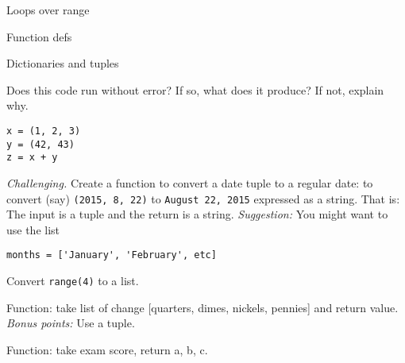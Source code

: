 \documentclass[11pt]{exam}
\begin{document}
\begin{questions}
\item Loops over range


\item Function defs


\item Dictionaries and tuples

\item
Does this code run without error?  If so, what does it produce?  If not, explain why.
\begin{verbatim}
x = (1, 2, 3)
y = (42, 43)
z = x + y
\end{verbatim}



\item {\it Challenging.\/}
Create a function to convert a date tuple to a regular date:
to convert (say) \texttt{(2015, 8, 22)} to \texttt{August 22, 2015} expressed as a string.
That is:  The input is a tuple and the return is a string.
{\it Suggestion:\/} You might want to use the list
\begin{verbatim}
months = ['January', 'February', etc]
\end{verbatim}

\item Convert \texttt{range(4)} to a list.


\item Function:  take list of change [quarters, dimes, nickels, pennies] and return value. 
{\it Bonus points:\/} Use a tuple.  

\item Function:  take exam score, return a, b, c.

\end{questions}
\end{document}
